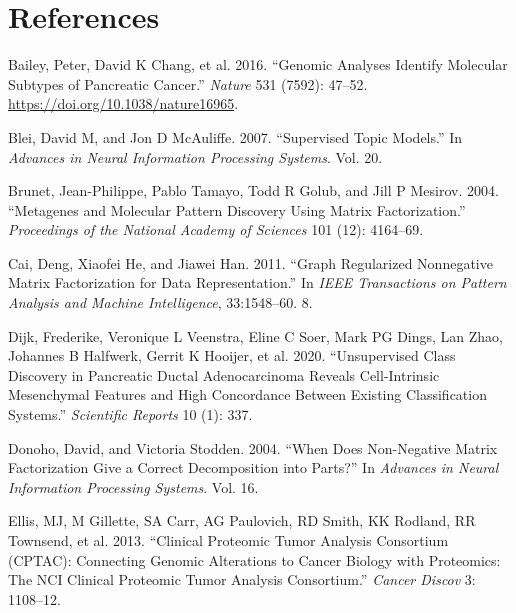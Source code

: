 \documentclass[
]{article}
\newlength{\cslhangindent}
\newenvironment{CSLReferences}[2] %
 {\begin{list}{}{%
  \setlength{\itemindent}{0pt}
  \setlength{\leftmargin}{0pt}
  \setlength{\parsep}{0pt}
  \ifodd #1
   \setlength{\leftmargin}{\cslhangindent}
   \setlength{\itemindent}{-1\cslhangindent}
  \fi
  \setlength{\itemsep}{#2\baselineskip}}}
 {\end{list}}
\begin{document}
\clearpage

\section{References}

\label{refs}
\begin{CSLReferences}{1}{0}
Bailey, Peter, David K Chang, et al. 2016. {``Genomic Analyses Identify
Molecular Subtypes of Pancreatic Cancer.''} \emph{Nature} 531 (7592):
47--52. \url{https://doi.org/10.1038/nature16965}.

Blei, David M, and Jon D McAuliffe. 2007. {``Supervised Topic Models.''}
In \emph{Advances in Neural Information Processing Systems}. Vol. 20.

Brunet, Jean-Philippe, Pablo Tamayo, Todd R Golub, and Jill P Mesirov.
2004. {``Metagenes and Molecular Pattern Discovery Using Matrix
Factorization.''} \emph{Proceedings of the National Academy of Sciences}
101 (12): 4164--69.

Cai, Deng, Xiaofei He, and Jiawei Han. 2011. {``Graph Regularized
Nonnegative Matrix Factorization for Data Representation.''} In
\emph{IEEE Transactions on Pattern Analysis and Machine Intelligence},
33:1548--60. 8.

Dijk, Frederike, Veronique L Veenstra, Eline C Soer, Mark PG Dings, Lan
Zhao, Johannes B Halfwerk, Gerrit K Hooijer, et al. 2020.
{``Unsupervised Class Discovery in Pancreatic Ductal Adenocarcinoma
Reveals Cell-Intrinsic Mesenchymal Features and High Concordance Between
Existing Classification Systems.''} \emph{Scientific Reports} 10 (1):
337.

Donoho, David, and Victoria Stodden. 2004. {``When Does Non-Negative
Matrix Factorization Give a Correct Decomposition into Parts?''} In
\emph{Advances in Neural Information Processing Systems}. Vol. 16.

Ellis, MJ, M Gillette, SA Carr, AG Paulovich, RD Smith, KK Rodland, RR
Townsend, et al. 2013. {``Clinical Proteomic Tumor Analysis Consortium
(CPTAC): Connecting Genomic Alterations to Cancer Biology with
Proteomics: The NCI Clinical Proteomic Tumor Analysis Consortium.''}
\emph{Cancer Discov} 3: 1108--12.


\end{CSLReferences}
\end{document}
